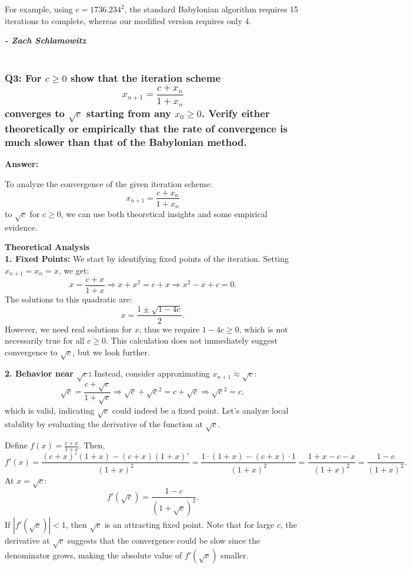 \documentclass[8pt]{article}
\begin{document}
For example, using $c = 1736.234^2$, the standard Babylonian algorithm requires 15 iterations to complete, whereas our modified version requires only 4.

\textbf{\textit{- Zach Schlamowitz }} \\\\

\subsubsection*{Q3:  For $c \geq 0$ show that the iteration scheme
\[
x_{n+1} = \frac{c + x_n}{1 + x_n}
\]
converges to $\sqrt{c}$ starting from any $x_0 \geq 0$. Verify either theoretically or empirically that the rate of convergence is much slower than that of the Babylonian method.}

\textbf{Answer:}

To analyze the convergence of the given iteration scheme:
\[
x_{n+1} = \frac{c + x_n}{1 + x_n}
\]
to $\sqrt{c}$ for $c \geq 0$, we can use both theoretical insights and some empirical evidence.

\textbf{Theoretical Analysis}\\
\textbf{1. Fixed Points:} We start by identifying fixed points of the iteration. Setting $x_{n+1} = x_n = x$, we get:
   \[
   x = \frac{c + x}{1 + x} \Rightarrow x + x^2 = c + x \Rightarrow x^2 - x + c = 0.
   \]
   The solutions to this quadratic are:
   \[
   x = \frac{1 \pm \sqrt{1 - 4c}}{2}.
   \]
   However, we need real solutions for $x$, thus we require $1 - 4c \geq 0$, which is not necessarily true for all $c \geq 0$. This calculation does not immediately suggest convergence to $\sqrt{c}$, but we look further.

\textbf{2. Behavior near $\sqrt{c}$:} Instead, consider approximating $x_{n+1} \approx \sqrt{c}$:
   \[
   \sqrt{c} = \frac{c + \sqrt{c}}{1 + \sqrt{c}} \Rightarrow \sqrt{c} + \sqrt{c}^2 = c + \sqrt{c} \Rightarrow \sqrt{c}^2 = c,
   \]
   which is valid, indicating $\sqrt{c}$ could indeed be a fixed point. Let’s analyze local stability by evaluating the derivative of the function at $\sqrt{c}$.

   Define $f(x) = \frac{c + x}{1 + x}$. Then,
   \[
   f'(x) = \frac{(c + x)'(1 + x) - (c + x)(1 + x)'}{(1 + x)^2} = \frac{1 \cdot (1 + x) - (c + x) \cdot 1}{(1 + x)^2} = \frac{1 + x - c - x}{(1 + x)^2} = \frac{1 - c}{(1 + x)^2}.
   \]
   At $x = \sqrt{c}$:
   \[
   f'(\sqrt{c}) = \frac{1 - c}{(1 + \sqrt{c})^2}.
   \]
   If $|f'(\sqrt{c})| < 1$, then $\sqrt{c}$ is an attracting fixed point. Note that for large $c$, the derivative at $\sqrt{c}$ suggests that the convergence could be slow since the denominator grows, making the absolute value of $f'(\sqrt{c})$ smaller.\\
\end{document}
